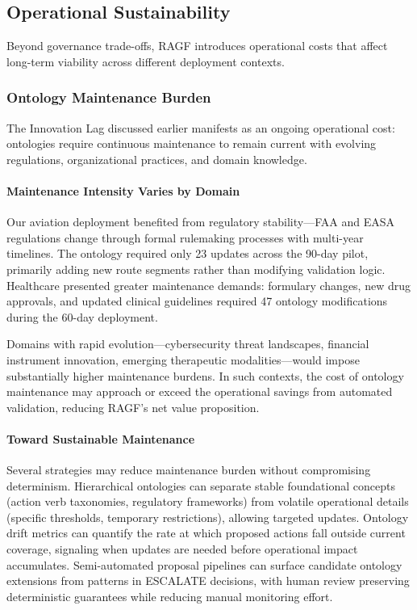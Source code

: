 \documentclass[sigconf,nonacm]{acmart}
\begin{document}
\subsection{Operational Sustainability}
\label{sec:operational-sustainability}

Beyond governance trade-offs, RAGF introduces operational costs that affect long-term viability across different deployment contexts.

\subsubsection{Ontology Maintenance Burden}

The Innovation Lag discussed earlier manifests as an ongoing operational cost: ontologies require continuous maintenance to remain current with evolving regulations, organizational practices, and domain knowledge.

\paragraph{Maintenance Intensity Varies by Domain} Our aviation deployment benefited from regulatory stability---FAA and EASA regulations change through formal rulemaking processes with multi-year timelines. The ontology required only 23 updates across the 90-day pilot, primarily adding new route segments rather than modifying validation logic. Healthcare presented greater maintenance demands: formulary changes, new drug approvals, and updated clinical guidelines required 47 ontology modifications during the 60-day deployment.

Domains with rapid evolution---cybersecurity threat landscapes, financial instrument innovation, emerging therapeutic modalities---would impose substantially higher maintenance burdens. In such contexts, the cost of ontology maintenance may approach or exceed the operational savings from automated validation, reducing RAGF's net value proposition.

\paragraph{Toward Sustainable Maintenance} Several strategies may reduce maintenance burden without compromising determinism. Hierarchical ontologies can separate stable foundational concepts (action verb taxonomies, regulatory frameworks) from volatile operational details (specific thresholds, temporary restrictions), allowing targeted updates. Ontology drift metrics can quantify the rate at which proposed actions fall outside current coverage, signaling when updates are needed before operational impact accumulates. Semi-automated proposal pipelines can surface candidate ontology extensions from patterns in ESCALATE decisions, with human review preserving deterministic guarantees while reducing manual monitoring effort.
\end{document}
